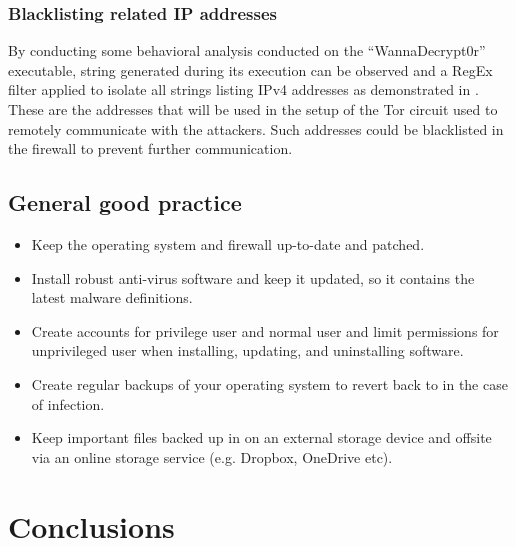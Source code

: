 \documentclass[10pt,a4paper]{article}
\begin{document}
\subsubsection{Blacklisting related IP addresses}
By conducting some behavioral analysis conducted on the ``WannaDecrypt0r'' executable, string generated during its execution can be observed and a RegEx filter applied to isolate all strings listing IPv4 addresses as demonstrated in \cite{wanacryFindIpAddr}. These are the addresses that will be used in the setup of the Tor circuit used to remotely communicate with the attackers. Such addresses could be blacklisted in the firewall to prevent further communication.

\subsection{General good practice}
\begin{itemize}
\item Keep the operating system and firewall up-to-date and patched.
\item Install robust anti-virus software and keep it updated, so it contains the latest malware definitions.
\item Create accounts for privilege user and normal user and limit permissions for unprivileged user when installing, updating, and uninstalling software.
\item Create regular backups of your operating system to revert back to in the case of infection.
\item Keep important files backed up in on an external storage device and offsite via an online storage service (e.g. Dropbox, OneDrive etc).
\end{itemize}


\section{Conclusions}


\newpage
\end{document}
